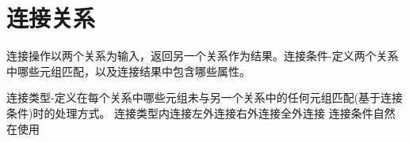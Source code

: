 \section{连接关系}

连接操作以两个关系为输入，返回另一个关系作为结果。连接条件-定义两个关系中哪些元组匹配，以及连接结果中包含哪些属性。

连接类型-定义在每个关系中哪些元组未与另一个关系中的任何元组匹配(基于连接条件)时的处理方式。
连接类型内连接左外连接右外连接全外连接
连接条件自然在使用
